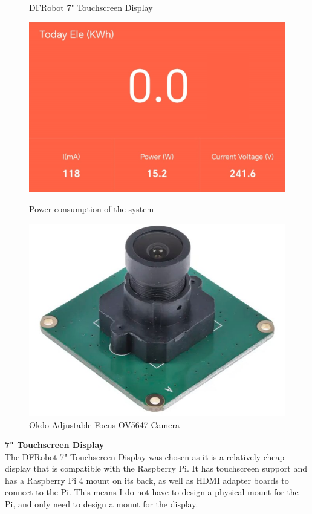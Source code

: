 \begin{figure}
\begin{minipage}[t]{0.22\textwidth}
    \caption{DFRobot 7" Touchscreen Display\cite{7inchdisplay}}
  \end{minipage}
  \hfill
  \begin{minipage}[t]{0.22\textwidth}
      \centering
      \includegraphics[width=\textwidth]{imgs/powermeter.png}
      \caption{Power consumption of the system}
  \end{minipage}
  \hfill
  \begin{minipage}[t]{0.22\textwidth}
    \centering
    \includegraphics[width=\textwidth]{imgs/okdo_camera.jpg}
    \caption{Okdo Adjustable Focus OV5647 Camera\cite{okdocamera}}
  \end{minipage}
\end{figure}

\vspace{1em}
\noindent
\textbf{7" Touchscreen Display} \\
The DFRobot 7" Touchscreen Display was chosen as it is a relatively cheap display that is compatible with the Raspberry Pi.
It has touchscreen support and has a Raspberry Pi 4 mount on its back, as well as HDMI adapter boards to connect to the Pi.
This means I do not have to design a physical mount for the Pi, and only need to design a mount for the display.

